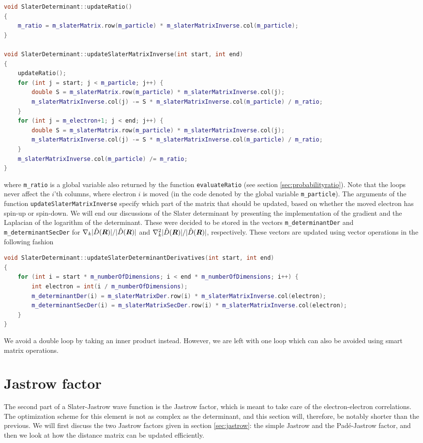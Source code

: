 \begin{lstlisting}[language={c++}]
void SlaterDeterminant::updateRatio()
{
	m_ratio = m_slaterMatrix.row(m_particle) * m_slaterMatrixInverse.col(m_particle);
}

void SlaterDeterminant::updateSlaterMatrixInverse(int start, int end)
{
	updateRatio();
	for (int j = start; j < m_particle; j++) {
		double S = m_slaterMatrix.row(m_particle) * m_slaterMatrixInverse.col(j);
		m_slaterMatrixInverse.col(j) -= S * m_slaterMatrixInverse.col(m_particle) / m_ratio;
	}
	for (int j = m_electron+1; j < end; j++) {
		double S = m_slaterMatrix.row(m_particle) * m_slaterMatrixInverse.col(j);
		m_slaterMatrixInverse.col(j) -= S * m_slaterMatrixInverse.col(m_particle) / m_ratio;
	}
	m_slaterMatrixInverse.col(m_particle) /= m_ratio;
}
\end{lstlisting}
where \lstinline{m_ratio} is a global variable also returned by the function \lstinline{evaluateRatio} (see section \ref{sec:probabilityratio}). Note that the loops never affect the $i$'th columns, where electron $i$ is moved (in the code denoted by the global variable \lstinline{m_particle}). The arguments of the function \lstinline{updateSlaterMatrixInverse} specify which part of the matrix that should be updated, based on whether the moved electron has spin-up or spin-down. We will end our discussions of the Slater determinant by presenting the implementation of the gradient and the Laplacian of the logarithm of the determinant. These were decided to be stored in the vectors \lstinline{m_determinantDer} and \lstinline{m_determinantSecDer} for $\nabla_k|\hat{D}(\boldsymbol{{R}})|/|\hat{D}(\boldsymbol{{R}})|$ and $\nabla_k^2|\hat{D}(\boldsymbol{{R}})|/|\hat{D}(\boldsymbol{{R}})|$, respectively. These vectors are updated using vector operations in the following fashion
\begin{lstlisting}[language={c++}]
void SlaterDeterminant::updateSlaterDeterminantDerivatives(int start, int end)
{
	for (int i = start * m_numberOfDimensions; i < end * m_numberOfDimensions; i++) {
		int electron = int(i / m_numberOfDimensions);
		m_determinantDer(i) = m_slaterMatrixDer.row(i) * m_slaterMatrixInverse.col(electron);
		m_determinantSecDer(i) = m_slaterMatrixSecDer.row(i) * m_slaterMatrixInverse.col(electron);
	}
}
\end{lstlisting}
We avoid a double loop by taking an inner product instead. However, we are left with one loop which can also be avoided using smart matrix operations.

\section{Jastrow factor}
The second part of a Slater-Jastrow wave function is the Jastrow factor, which is meant to take care of the electron-electron correlations. The optimization scheme for this element is not as complex as the determinant, and this section will, therefore, be notably shorter than the previous. We will first discuss the two Jastrow factors given in section \ref{sec:jastrow}: the simple Jastrow and the Padé-Jastrow factor, and then we look at how the distance matrix can be updated efficiently. 

